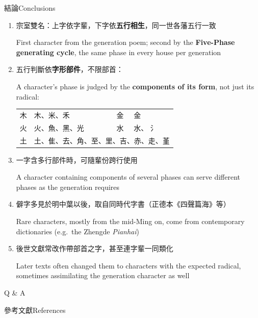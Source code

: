 \documentclass[aspectratio=169,12pt,t]{beamer}
\newcommand{\Mu}{\textcolor{wxmu}{木}}
\newcommand{\Huo}{\textcolor{wxhuo}{火}}
\newcommand{\Tu}{\textcolor{wxtu}{土}}
\newcommand{\Jin}{\textcolor{wxjin}{金}}
\newcommand{\Shui}{\textcolor{wxshui}{水}}
\newcommand{\cmu}[1]{\textcolor{wxmu}{#1}}
\newcommand{\chuo}[1]{\textcolor{wxhuo}{#1}}
\newcommand{\ctu}[1]{\textcolor{wxtu}{#1}}
\newcommand{\cjin}[1]{\textcolor{wxjin}{#1}}
\newcommand{\cshui}[1]{\textcolor{wxshui}{#1}}
\newcommand{\en}[1]{\par{\parskip=0pt\scriptsize\color{black!60}#1\par}}
\begin{document}
\begin{frame}{結論}{Conclusions}
  \small
  \begin{enumerate}\setlength{\itemsep}{0pt}
    \item 宗室雙名：上字依字輩，下字依\textbf{五行相生}，同一世各藩五行一致
      \en{First character from the generation poem; second by the \textbf{Five-Phase generating cycle}, the same phase in every house per generation}
    \item 五行判斷依\textbf{字形部件}，不限部首：
      \en{A character's phase is judged by the \textbf{components of its form}, not just its radical:}
      \vspace{0.2em}
      {\small
        \begin{tabularx}{\linewidth}{@{}c l@{\qquad}c X@{}}
          \Mu   & \cmu{木}、\cmu{米}、\cmu{禾}       & \Jin  & \cjin{金} \\
          \Huo  & \chuo{火}、\chuo{魚}、\chuo{黑}、\chuo{光}   & \Shui & \cshui{水}、 \cshui{氵} \\
          \Tu   & \multicolumn{3}{l}{\ctu{土}、\ctu{隹}、\ctu{去}、\ctu{角}、\ctu{至}、\ctu{里}、\ctu{吉}、\ctu{赤}、\ctu{走}、\ctu{堇}} \\
      \end{tabularx}}
    \item 一字含多行部件時，可隨輩份跨行使用
      \en{A character containing components of several phases can serve different phases as the generation requires}
    \item 僻字多見於明中葉以後，取自同時代字書（正德本《四聲篇海》等）
      \en{Rare characters, mostly from the mid-Ming on, come from contemporary dictionaries (e.g.\ the Zhengde \emph{Pianhai})}
    \item 後世文獻常改作帶部首之字，甚至連字輩一同類化
      \en{Later texts often changed them to characters with the expected radical, sometimes assimilating the generation character as well}
  \end{enumerate}
\end{frame}

\begin{frame}[c]
  \centering
  \Huge Q \& A
  \vspace{1em}

  \normalsize
\end{frame}

\begin{frame}[allowframebreaks]{參考文獻}{References}
  \nocite{*}
  \printbibliography[heading=none]
\end{frame}
\end{document}
